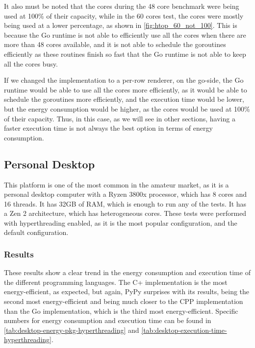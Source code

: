 It also must be noted that the cores during the 48 core benchmark were being used at 100\% of their capacity, while in the 60 cores test, the cores were mostly being used at a lower percentage, as shown in \autoref{fig:htop_60_not_100}. This is because the Go runtime is not able to efficiently use all the cores when there are more than 48 cores available, and it is not able to schedule the goroutines efficiently as these routines finish so fast that the Go runtime is not able to keep all the cores busy.

If we changed the implementation to a per-row renderer, on the go-side, the Go runtime would be able to use all the cores more efficiently, as it would be able to schedule the goroutines more efficiently, and the execution time would be lower, but the energy consumption would be higher, as the cores would be used at 100\% of their capacity. Thus, in this case, as we will see in other sections, having a faster execution time is not always the best option in terms of energy consumption.





\subsection{Personal Desktop}
This platform is one of the most common in the amateur market, as it is a personal desktop computer with a Ryzen 3800x processor, which has 8 cores and 16 threads. It has 32GB of RAM, which is enough to run any of the tests. It has a Zen 2 architecture, which has heterogeneous cores. These tests were performed with hyperthreading enabled, as it is the most popular configuration, and the default configuration. 


\subsubsection{Results}






These results show a clear trend in the energy consumption and execution time of the different programming languages. The C\++ implementation is the most energy-efficient, as expected, but again, PyPy surprises with its results, being the second most energy-efficient and being much closer to the \gls{CPP} implementation than the Go implementation, which is the third most energy-efficient. Specific numbers for energy consumption and execution time can be found in \autoref{tab:desktop-energy-pkg-hyperthreading} and \autoref{tab:desktop-execution-time-hyperthreading}.


